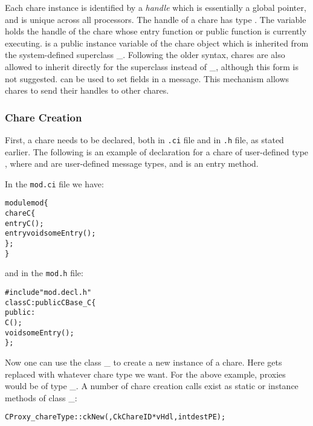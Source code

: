 Each chare instance is identified by a {\em handle} 
which is essentially a global pointer, and is unique across all
processors.  The handle of a chare has type .  The
variable  holds the handle of the
chare whose entry function or public function is currently executing.
 is a public instance variable of the chare object
which is inherited from the system-defined superclass
\_.
Following the older syntax, chares are also allowed to inherit directly
for the superclass  instead of \_, although
this form is not suggested.
 can be used to set fields in a message. This  
mechanism allows chares to send their handles to other chares.

\subsubsection{Chare Creation}
\label{chare creation}

First, a chare needs to be declared, both in \texttt{.ci} file and
in \texttt{.h} file, as stated earlier. The following is an example of
declaration for a chare of user-defined type , where 
and  are user-defined message types, and 
is an entry method.

In the \texttt{mod.ci} file we have:

\begin{alltt}
module mod \{
  chare C \{
    entry C();
    entry void someEntry();
  \};
\}
\end{alltt}

and in the \texttt{mod.h} file:

\begin{alltt}
#include "mod.decl.h"
class C : public CBase\_C \{
  public:
    C();
    void someEntry();
\};
\end{alltt}

Now one can use the class \_ to create a new instance
of a chare.  Here  gets replaced with whatever
chare type we want.  For the above example, proxies would be of
type \_. A number of chare creation calls exist
as static or instance methods of class \_:

\begin{alltt}
   CProxy_chareType::ckNew(, CkChareID *vHdl, int destPE);
\end{alltt}

